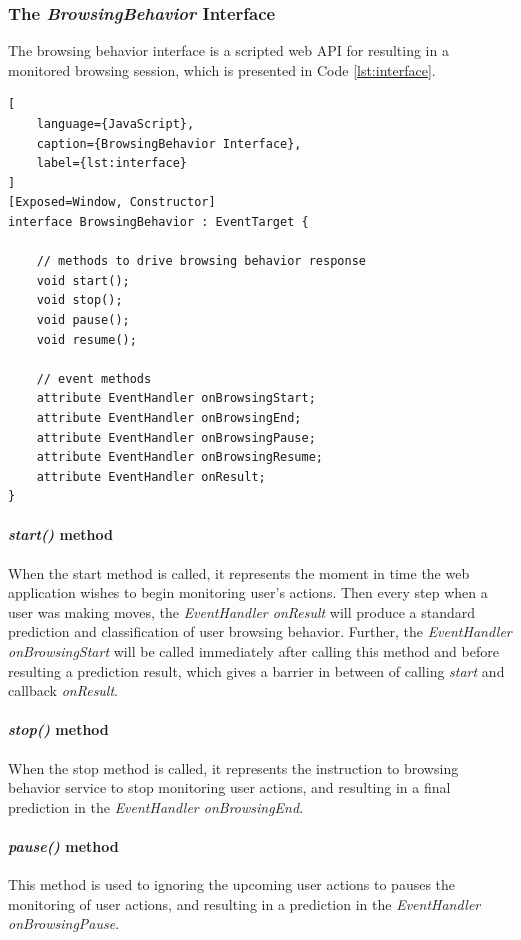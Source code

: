 \subsubsection{The \emph{BrowsingBehavior} Interface}

The browsing behavior interface is a scripted web API for resulting in a monitored browsing
session, which is presented in Code \ref{lst:interface}.

\begin{lstlisting}[
    language={JavaScript},
    caption={BrowsingBehavior Interface},
    label={lst:interface}
]
[Exposed=Window, Constructor]
interface BrowsingBehavior : EventTarget {
    
    // methods to drive browsing behavior response
    void start();
    void stop();
    void pause();
    void resume();

    // event methods
    attribute EventHandler onBrowsingStart;
    attribute EventHandler onBrowsingEnd;
    attribute EventHandler onBrowsingPause;
    attribute EventHandler onBrowsingResume;
    attribute EventHandler onResult;
}
\end{lstlisting}


\paragraph{\emph{start()} method} When the start method is called, it represents the moment in
time the web application wishes to begin monitoring user's actions.
Then every step when a user was making moves, the \emph{EventHandler onResult} will produce
a standard prediction and classification of user browsing behavior. Further, 
the \emph{EventHandler onBrowsingStart} will be called immediately after calling 
this method and before resulting a prediction result, which gives a barrier in between of
calling \emph{start} and callback \emph{onResult}.

\paragraph{\emph{stop()} method} When the stop method is called, it represents the instruction
to browsing behavior service to stop monitoring user actions, and resulting in a 
final prediction in the \emph{EventHandler onBrowsingEnd}.

\paragraph{\emph{pause()} method} This method is used to ignoring the upcoming user actions
to pauses the monitoring of user actions, and resulting in a prediction in the 
\emph{EventHandler onBrowsingPause}.

